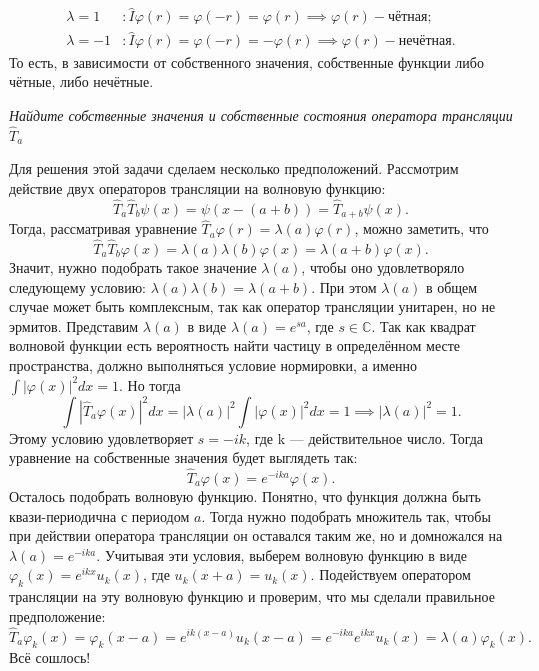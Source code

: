 \begin{align*}
  \lambda = 1 &: \hat I \varphi(r) = \varphi(-r) = \varphi(r) \implies \varphi(r) - \text{чётная}; \\
  \lambda = -1 &: \hat I \varphi(r) = \varphi(-r) = -\varphi(r) \implies \varphi(r) - \text{нечётная}.
\end{align*}
То есть, в зависимости от собственного значения, собственные функции либо
чётные, либо нечётные.
\qedsq
\begin{exercise}
  \textit{Найдите собственные значения и собственные состояния оператора
    трансляции $\hat T_a$}
\end{exercise}
Для решения этой задачи сделаем несколько предположений. Рассмотрим действие
двух операторов трансляции на волновую функцию:
\[
  \hat{T}_{a}\hat{T}_{b}\psi(x) = \psi(x - (a + b)) = \hat{T}_{a + b}\psi(x).
\]
Тогда, рассматривая уравнение $\hat T_a \varphi(r) = \lambda(a) \varphi(r)$,
можно заметить, что
\[
  \hat{T}_{a}\hat{T}_{b}\varphi(x) = \lambda(a)\lambda(b)\varphi(x) =
  \lambda(a + b) \varphi(x).
\]
Значит, нужно подобрать такое значение $\lambda(a)$, чтобы оно удовлетворяло
следующему условию: $\lambda(a)\lambda(b) = \lambda(a + b)$. При этом
$\lambda(a)$ в общем случае может быть комплексным, так как оператор трансляции
унитарен, но не эрмитов. Представим $\lambda(a)$ в виде $\lambda(a) = e^{sa}$,
где $s \in \mathbb{C}$. Так как квадрат волновой функции есть вероятность найти
частицу в определённом месте пространства, должно выполняться условие
нормировки, а именно $\int |\varphi(x)|^2 dx = 1$. Но тогда
\[
  \int |\hat{T}_a\varphi(x)|^2 dx = |\lambda(a)|^2\int |\varphi(x)|^2 dx = 1
  \implies |\lambda(a)|^2 = 1.
\]
Этому условию удовлетворяет $s = -ik$, где k --- действительное число. Тогда
уравнение на собственные значения будет выглядеть так:
\[
  \hat{T}_{a}\varphi(x) = e^{-ika}\varphi(x).
\]
Осталось подобрать волновую функцию. Понятно, что функция должна быть
квази-периодична с периодом $a$. Тогда нужно подобрать множитель так, чтобы при
действии оператора трансляции он оставался таким же, но и домножался на
$\lambda(a) = e^{-ika}$. Учитывая эти условия, выберем волновую функцию в виде
$\varphi_k(x) = e^{ikx}u_k(x)$, где $u_k(x + a) = u_k(x)$. Подействуем
оператором трансляции на эту волновую функцию и проверим, что мы сделали
правильное предположение:
\[
  \hat T_a \varphi_k(x) = \varphi_k(x - a) = e^{ik(x - a)} u_k(x - a) = e^{-ika} e^{ikx} u_k(x) = \lambda(a) \varphi_k(x).
\]
Всё сошлось!
\qedsq

